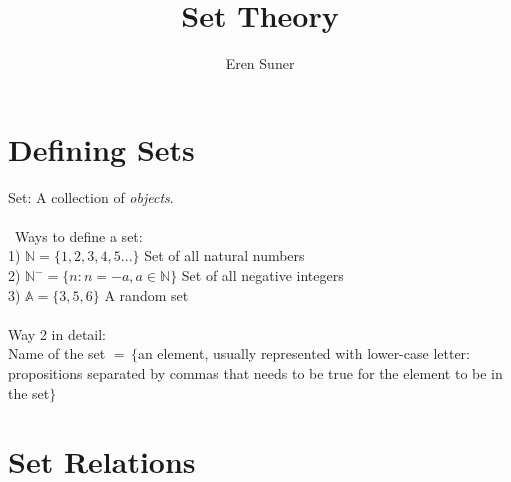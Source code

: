 \documentclass[12pt,a4paper,notitlepage]{article}
\title{Set Theory}
\author{Eren Suner}
\begin{document}
\maketitle
\section{Defining Sets}
Set: A collection of \textit{objects}.\\\\
\, Ways to define a set: \\
1) $\mathbb{N} = \{1,2,3,4,5...\}$ Set of all natural numbers\\
2) $\mathbb{N}^{-} = \{n  : n = -a, a\in \mathbb{N}\}$ Set of all negative integers \\
3) $\mathbb{A} = \{3,5,6\}$ A random set\\\\
Way 2 in detail:\\
Name of the set $= \,\{$an element, usually represented with lower-case letter$ :$ propositions separated by commas that needs to be true for the element to be in the set$\}$

\section{Set Relations}
\end{document}
